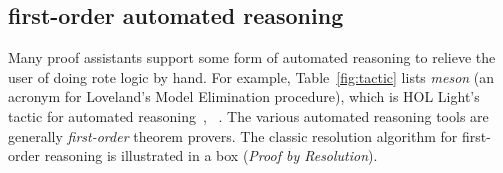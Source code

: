 \documentclass{llncs}
\begin{document}
\subsection{first-order automated reasoning}

Many proof assistants support some form of automated reasoning to
relieve the user of doing rote logic by hand. For example,
Table~\ref{fig:tactic} lists {\it meson} (an acronym for Loveland's
Model Elimination procedure), which is HOL Light's tactic for
automated reasoning~\cite[Sec.~3.15]{Ha09}, ~\cite{harrison:meson}.
The various automated reasoning tools are generally {\it first-order}
theorem provers.  The classic resolution algorithm for first-order
reasoning is illustrated in a box ({\it Proof by Resolution}).

\newpage
\bigskip
\noindent
\end{document}
